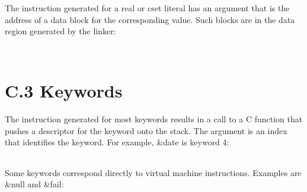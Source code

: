 \begin{noIndex}
\begin{flushleft}
\begin{xtabular}{|m{1.9066598in}|m{2.75596in}|}
\end{xtabular}
\end{flushleft}

The instruction generated for a real or cset literal has an argument
that is the address of a data block for the corresponding value. Such
blocks are in the data region generated by the linker:

\begin{flushleft}
\tablelasttail{\hline}
\begin{xtabular}{|m{1.9066598in}|m{2.75596in}|}

\end{xtabular}
\end{flushleft}

\bigskip

\begin{flushleft}
\tablelasttail{\hline}
\begin{xtabular}{|m{1.9066598in}|m{2.75596in}|}

\end{xtabular}
\end{flushleft}
\section{C.3 Keywords}

The instruction generated for most keywords results in a call to a C
function that pushes a descriptor for the keyword onto the stack. The
argument is an index that identifies the keyword. For example, \&date
is keyword 4:

\begin{flushleft}
\tablelasttail{\hline}
\begin{xtabular}{|m{1.9066598in}|m{2.75596in}|}

\end{xtabular}
\end{flushleft}

Some keywords correspond directly to virtual machine
instructions. Examples are \&null and \&fail:

\begin{flushleft}
\tablelasttail{\hline}
\begin{xtabular}{|m{1.9066598in}|m{2.75596in}|}


\end{xtabular}
\end{flushleft}
\end{noIndex}
